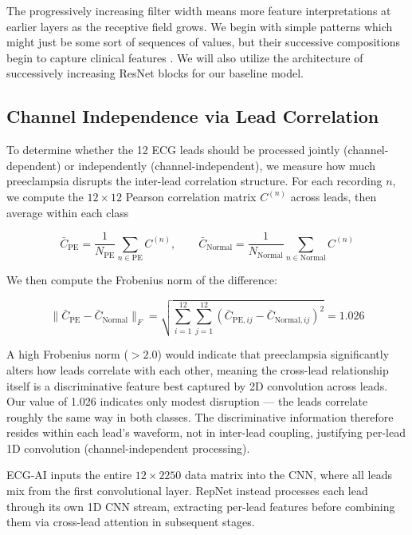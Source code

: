 \documentclass[sigconf,nonacm]{acmart}
\begin{document}
The progressively increasing filter width means more feature interpretations at earlier layers as the receptive field grows. We begin with simple patterns which might just be some sort of sequences of values, but their successive compositions begin to capture clinical features \cite{he_deep_2015}. We will also utilize the architecture of successively increasing ResNet blocks for our baseline model.

\subsection{Channel Independence via Lead Correlation}

To determine whether the 12 ECG leads should be processed jointly (channel-dependent) or independently (channel-independent), we measure how much preeclampsia disrupts the inter-lead correlation structure. For each recording $n$, we compute the $12 \times 12$ Pearson correlation matrix $C^{(n)}$ across leads, then average within each class

\begin{equation}
\bar{C}_{\text{PE}} = \frac{1}{N_{\text{PE}}} \sum_{n \in \text{PE}} C^{(n)}, \qquad
\bar{C}_{\text{Normal}} = \frac{1}{N_{\text{Normal}}} \sum_{n \in \text{Normal}} C^{(n)}
\end{equation}

We then compute the Frobenius norm of the difference:

\begin{equation}
\| \bar{C}_{\text{PE}} - \bar{C}_{\text{Normal}} \|_F = \sqrt{\sum_{i=1}^{12}\sum_{j=1}^{12} \left(\bar{C}_{\text{PE},ij} - \bar{C}_{\text{Normal},ij}\right)^2} = 1.026
\end{equation}

A high Frobenius norm ($>2.0$) would indicate that preeclampsia significantly alters how leads correlate with each other, meaning the cross-lead relationship itself is a discriminative feature best captured by 2D convolution across leads. Our value of 1.026 indicates only modest disruption --- the leads correlate roughly the same way in both classes. The discriminative information therefore resides within each lead's waveform, not in inter-lead coupling, justifying per-lead 1D convolution (channel-independent processing).

ECG-AI inputs the entire $12 \times 2250$ data matrix into the CNN, where all leads mix from the first convolutional layer. RepNet instead processes each lead through its own 1D CNN stream, extracting per-lead features before combining them via cross-lead attention in subsequent stages.
\end{document}
